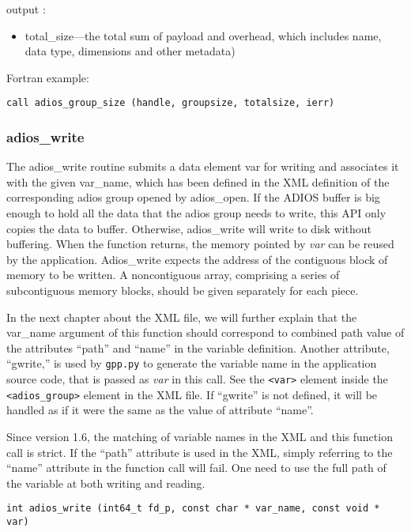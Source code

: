 output :
\begin{itemize}
\item total\_size---the total sum of payload and overhead, which includes name, data 
type, dimensions and other metadata)
\end{itemize}

Fortran example: 
\begin{lstlisting}[alsolanguage=Fortran, caption={}]
call adios_group_size (handle, groupsize, totalsize, ierr)
\end{lstlisting}

\subsubsection{adios\_write}
The adios\_write routine submits a data element var for writing and associates 
it with the given var\_name, which has been defined in the XML definition of the 
corresponding adios group opened by 
adios\_open. If the ADIOS buffer is big enough to hold all the data that the adios 
group needs to write, this API only copies the data to buffer. Otherwise, adios\_write 
will write to disk without buffering. When the function returns, the memory pointed
by \textit{var} can be reused by the application. 
Adios\_write expects the address of the contiguous block of memory to be written. 
A noncontiguous array, comprising a series of subcontiguous memory blocks, 
should be given separately for each piece.

In the next chapter about the XML file, we will further explain that the var\_name
argument of this function should correspond to combined path value of the
attributes ``path'' and ``name'' in the variable definition. 
Another attribute, ``gwrite,'' is used by \verb+gpp.py+ to generate the variable name in
the application source code, that is passed as \textit{var} in this call. 
See the \verb+<var>+ element inside the \verb+<adios_group>+ element 
in the XML file. 
If ``gwrite'' is not defined, it will be handled as if it were the same as the value of attribute ``name''.

Since version 1.6, the matching of variable names in the XML and this function call 
is strict. If the ``path'' attribute is used in the XML, simply referring to the 
``name'' attribute in the function call will fail. One need to use the full path of 
the variable at both writing and reading. 

\begin{lstlisting}[alsolanguage=C,caption={},label={}]
int adios_write (int64_t fd_p, const char * var_name, const void * var)
\end{lstlisting}

